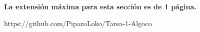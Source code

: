 \begin{mdframed}
    \textbf{La extensión máxima para esta sección es de 1 página.}
\end{mdframed}

https://github.com/PipazoLoko/Tarea-1-Algoco

